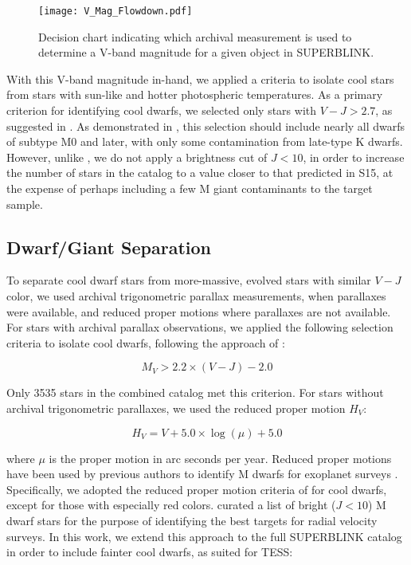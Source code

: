 \documentclass[twocolumn]{aastex62}
\begin{document}
\begin{figure}
    \centering
    \texttt{[image: V\_Mag\_Flowdown.pdf]}
    \caption{Decision chart indicating which archival measurement is used to determine a V-band magnitude for a given object in SUPERBLINK.}
    \label{v_mag_flowdown}
\end{figure}


With this V-band magnitude in-hand, we applied a criteria to isolate cool stars from stars with sun-like and hotter photospheric temperatures.  As a primary criterion for identifying cool dwarfs, we selected only stars with $V-J>2.7$, as suggested in \citet[][]{Lepine2011}. As demonstrated in \citet[][]{Lepine2013}, this selection should include nearly all dwarfs of subtype M0 and later, with only some contamination from late-type K dwarfs.  However, unlike \citet{Lepine2011}, we do not apply a brightness cut of $J<10$, in order to increase the number of stars in the catalog to a value closer to that predicted in S15, at the expense of perhaps including a few M giant contaminants to the target sample.



\subsection{Dwarf/Giant Separation}

To separate cool dwarf stars from more-massive, evolved stars with similar $V-J$ color, we used archival trigonometric parallax measurements, when parallaxes were available, and reduced proper motions where parallaxes are not available.  For stars with archival parallax observations, we applied the following selection criteria to isolate cool dwarfs, following the approach of \citet[][]{Gaidos2014}:

\begin{equation}
M_V > 2.2 \times (V - J) - 2.0 
\label{parallax_equation}
\end{equation}

Only 3535 stars in the combined catalog met this criterion.  For stars without archival trigonometric parallaxes, we used the reduced proper motion $H_V$:

\begin{equation}
H_V = V + 5.0 \times \log(\mu) + 5.0
\end{equation}

\noindent where $\mu$ is the proper motion in arc seconds per year.  Reduced proper motions have been used by previous authors to identify M dwarfs for exoplanet surveys \citep[e.g.][]{Lepine2011}.  Specifically, we adopted the reduced proper motion criteria of \citet[][]{Gaidos2014} for cool dwarfs, except for those with especially red colors.  \citet[][]{Gaidos2014} curated a list of bright ($J<10$) M dwarf stars for the purpose of identifying the best targets for radial velocity surveys.  In this work, we extend this approach to the full SUPERBLINK catalog in order to include fainter cool dwarfs, as suited for TESS:
\end{document}
